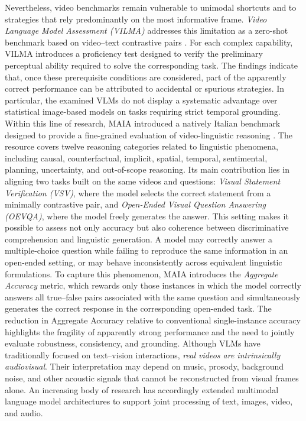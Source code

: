 Nevertheless, video benchmarks remain vulnerable to unimodal shortcuts and to strategies that rely predominantly on the most informative frame. \textit{Video Language Model Assessment (\acs{VILMA})} addresses this limitation as a zero-shot benchmark based on video--text contrastive pairs \cite{kesen2024vilma}. For each complex capability, \acs{VILMA} introduces a proficiency test designed to verify the preliminary perceptual ability required to solve the corresponding task. The findings indicate that, once these prerequisite conditions are considered, part of the apparently correct performance can be attributed to accidental or spurious strategies. In particular, the examined \acsp{VLM} do not display a systematic advantage over statistical image-based models on tasks requiring strict temporal grounding.
Within this line of research, \acs{MAIA} introduced a natively Italian benchmark designed to provide a fine-grained evaluation of video-linguistic reasoning \cite{testa2025maia}. The resource covers twelve reasoning categories related to linguistic phenomena, including causal, counterfactual, implicit, spatial, temporal, sentimental, planning, uncertainty, and out-of-scope reasoning. Its main contribution lies in aligning two tasks built on the same videos and questions: \textit{Visual Statement Verification (\acs{VSV})}, where the model selects the correct statement from a minimally contrastive pair, and \textit{Open-Ended Visual Question Answering (\acs{OEVQA})}, where the model freely generates the answer.
This setting makes it possible to assess not only accuracy but also coherence between discriminative comprehension and linguistic generation. A model may correctly answer a multiple-choice question while failing to reproduce the same information in an open-ended setting, or may behave inconsistently across equivalent linguistic formulations. To capture this phenomenon, \acs{MAIA} introduces the \textit{Aggregate Accuracy} metric, which rewards only those instances in which the model correctly answers all true--false pairs associated with the same question and simultaneously generates the correct response in the corresponding open-ended task. The reduction in Aggregate Accuracy relative to conventional single-instance accuracy highlights the fragility of apparently strong performance and the need to jointly evaluate robustness, consistency, and grounding.
Although \acsp{VLM} have traditionally focused on text--vision interactions, \textit{real videos are intrinsically audiovisual}. Their interpretation may depend on music, prosody, background noise, and other acoustic signals that cannot be reconstructed from visual frames alone. An increasing body of research has accordingly extended multimodal language model architectures to support joint processing of text, images, video, and audio.
